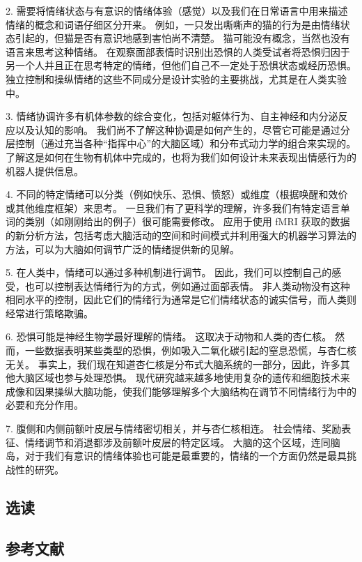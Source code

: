2. 需要将情绪状态与有意识的情绪体验（感觉）以及我们在日常语言中用来描述情绪的概念和词语仔细区分开来。 例如，一只发出嘶嘶声的猫的行为是由情绪状态引起的，但猫是否有意识地感到害怕尚不清楚。 猫可能没有概念，当然也没有语言来思考这种情绪。 在观察面部表情时识别出恐惧的人类受试者将恐惧归因于另一个人并且正在思考特定的情绪，但他们自己不一定处于恐惧状态或经历恐惧。 独立控制和操纵情绪的这些不同成分是设计实验的主要挑战，尤其是在人类实验中。 

3. 情绪协调许多有机体参数的综合变化，包括对躯体行为、自主神经和内分泌反应以及认知的影响。 我们尚不了解这种协调是如何产生的，尽管它可能是通过分层控制（通过充当各种“指挥中心”的大脑区域）和分布式动力学的组合来实现的。 了解这是如何在生物有机体中完成的，也将为我们如何设计未来表现出情感行为的机器人提供信息。 

4. 不同的特定情绪可以分类（例如快乐、恐惧、愤怒）或维度（根据唤醒和效价或其他维度框架）来思考。 一旦我们有了更科学的理解，许多我们有特定语言单词的类别（如刚刚给出的例子）很可能需要修改。 应用于使用 fMRI 获取的数据的新分析方法，包括考虑大脑活动的空间和时间模式并利用强大的机器学习算法的方法，可以为大脑如何调节广泛的情绪提供新的见解。 

5. 在人类中，情绪可以通过多种机制进行调节。 因此，我们可以控制自己的感受，也可以控制表达情绪行为的方式，例如通过面部表情。 非人类动物没有这种相同水平的控制，因此它们的情绪行为通常是它们情绪状态的诚实信号，而人类则经常进行策略欺骗。 

6. 恐惧可能是神经生物学最好理解的情绪。 这取决于动物和人类的杏仁核。 然而，一些数据表明某些类型的恐惧，例如吸入二氧化碳引起的窒息恐慌，与杏仁核无关。 事实上，我们现在知道杏仁核是分布式大脑系统的一部分，因此，许多其他大脑区域也参与处理恐惧。 现代研究越来越多地使用复杂的遗传和细胞技术来成像和因果操纵大脑功能，使我们能够理解多个大脑结构在调节不同情绪行为中的必要和充分作用。 

7. 腹侧和内侧前额叶皮层与情绪密切相关，并与杏仁核相连。 社会情绪、奖励表征、情绪调节和消退都涉及前额叶皮层的特定区域。 大脑的这个区域，连同脑岛，对于我们有意识的情绪体验也可能是最重要的，情绪的一个方面仍然是最具挑战性的研究。

\subsection{选读}
\subsection{参考文献}
